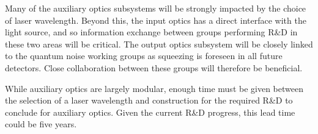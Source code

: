 



Many of the auxiliary optics subsystems will be strongly impacted by the choice of laser wavelength. Beyond this, the input optics has a direct interface with the light source, and so information exchange between groups performing R\&D in these two areas will be critical.
The output optics subsystem will be closely linked to the quantum noise working groups as squeezing is foreseen in all future detectors. Close collaboration between these groups will therefore be beneficial.

While auxiliary optics are largely modular, enough time must be given between the selection of a laser wavelength and construction for the required R\&D to conclude for auxiliary optics. Given the current R\&D progress, this lead time could be five years. 
